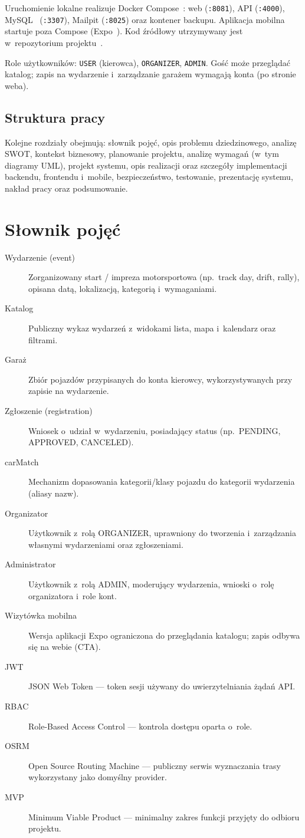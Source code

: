 \documentclass{sprz}
\begin{document}
Uruchomienie lokalne realizuje Docker Compose~\cite{docker:compose}: web (\texttt{:8081}), API (\texttt{:4000}), MySQL~\cite{mysql:docs} (\texttt{:3307}), Mailpit (\texttt{:8025}) oraz kontener backupu. Aplikacja mobilna startuje poza Compose (Expo~\cite{expo:docs}). Kod źródłowy utrzymywany jest w~repozytorium projektu~\cite{raceportal:repo}.

Role użytkowników: \texttt{USER} (kierowca), \texttt{ORGANIZER}, \texttt{ADMIN}. Gość może przeglądać katalog; zapis na wydarzenie i~zarządzanie garażem wymagają konta (po stronie weba).

\section{Struktura pracy}
Kolejne rozdziały obejmują: słownik pojęć, opis problemu dziedzinowego, analizę SWOT, kontekst biznesowy, planowanie projektu, analizę wymagań (w~tym diagramy UML), projekt systemu, opis realizacji oraz szczegóły implementacji backendu, frontendu i~mobile, bezpieczeństwo, testowanie, prezentację systemu, nakład pracy oraz podsumowanie.

\chapter{Słownik pojęć}
\begin{description}
  \item[Wydarzenie (event)] Zorganizowany start / impreza motorsportowa (np.\ track day, drift, rally), opisana datą, lokalizacją, kategorią i~wymaganiami.
  \item[Katalog] Publiczny wykaz wydarzeń z~widokami lista, mapa i~kalendarz oraz filtrami.
  \item[Garaż] Zbiór pojazdów przypisanych do konta kierowcy, wykorzystywanych przy zapisie na wydarzenie.
  \item[Zgłoszenie (registration)] Wniosek o~udział w~wydarzeniu, posiadający status (np.\ PENDING, APPROVED, CANCELED).
  \item[carMatch] Mechanizm dopasowania kategorii/klasy pojazdu do kategorii wydarzenia (aliasy nazw).
  \item[Organizator] Użytkownik z~rolą ORGANIZER, uprawniony do tworzenia i~zarządzania własnymi wydarzeniami oraz zgłoszeniami.
  \item[Administrator] Użytkownik z~rolą ADMIN, moderujący wydarzenia, wnioski o~rolę organizatora i~role kont.
  \item[Wizytówka mobilna] Wersja aplikacji Expo ograniczona do przeglądania katalogu; zapis odbywa się na webie (CTA).
  \item[JWT] JSON Web Token --- token sesji używany do uwierzytelniania żądań API.
  \item[RBAC] Role-Based Access Control --- kontrola dostępu oparta o~role.
  \item[OSRM] Open Source Routing Machine --- publiczny serwis wyznaczania trasy wykorzystany jako domyślny provider.
  \item[MVP] Minimum Viable Product --- minimalny zakres funkcji przyjęty do odbioru projektu.
\end{description}
\end{document}
